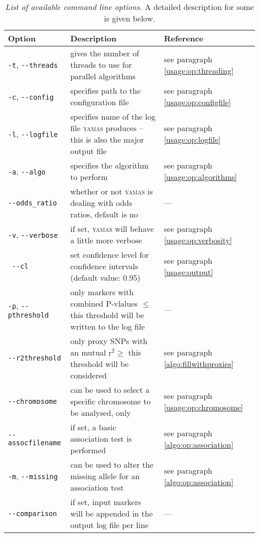 \begin{table}[H]
 \caption{\emph{List of available command line options.} A detailed description for some is given below.}
 \centering
 \label{usage:table:commandline_options}
\begin{tabular}{p{3cm}p{7cm}p{4cm}}
\rowcolor{light-gray}Option & Description & Reference\\\hline
\verb+-t+, \verb+--threads+ & gives the number of threads to use for parallel algorithms  & see paragraph \ref{usage:op:threading}\\
\verb+-c+, \verb+--config+  & specifies path to the configuration file                    & see paragraph \ref{usage:op:configfile}\\
\verb+-l+, \verb+--logfile+ & specifies name of the log file \textsc{yamas} produces -- this is also the major output file
                                                                                          & see paragraph \ref{usage:op:logfile}\\
\verb+-a+, \verb+--algo+    & specifies the algorithm to perform                          & see paragraph \ref{usage:op:algorithms}\\
\verb+--odds_ratio+         & whether or not \textsc{yamas} is dealing with odds ratios, default is no & --- \\
\verb+-v+, \verb+--verbose+  & if set, \textsc{yamas} will behave a little more verbose   & see paragraph \ref{usage:op:verbosity}\\
\verb+ --cl+		    & set confidence level for confidence intervals (default value: 0.95) & see paragraph \ref{usage:output} \\
\verb+-p+, \verb+--pthreshold+ & only markers with combined P-vlalues $\leq$ this threshold will be written to the log file & ---\\
\verb+--r2threshold+        & only proxy SNPs with an mutual r$^2 \geq$ this threshold will be considered & see paragraph \ref{algo:fillwithproxies}\\
\verb+--chromosome+         & can be used to select a specific chromosome to be analysed, only & see paragraph \ref{usage:op:chromosome}\\
\verb+--assocfilename+      & if set, a basic association test is performed                & see paragraph \ref{algo:op:association}\\
\verb+-m+, \verb+--missing+ & can be used to alter the missing allele for an association test & see paragraph \ref{algo:op:association}\\
\verb+--comparison+         & if set, input markers will be appended in the output log file per line & --- \\

\end{tabular}
\end{table}
